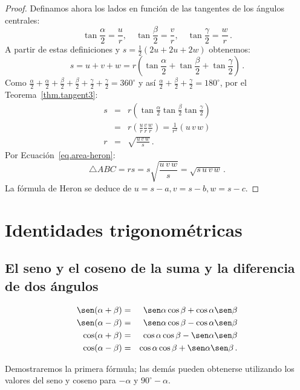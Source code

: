 \begin{proof}
Definamos ahora los lados en función de las tangentes de los ángulos centrales:
\begin{displaymath}
\tan \frac{\alpha}{2} = \frac{u}{r},\quad
\tan \frac{\beta}{2} = \frac{v}{r},\quad
\tan \frac{\gamma}{2} = \frac{w}{r}\,.
\end{displaymath}
A partir de estas definiciones y $s=\frac{1}{2}(2u+2u+2w)$ obtenemos:
\[
s = u+v+w = r\left(\tan \frac{\alpha}{2}+\tan \frac{\beta}{2}+\tan \frac{\gamma}{2}\right)\,.
\]
Como $\frac{\alpha}{2}+\frac{\alpha}{2}+\frac{\beta}{2}+\frac{\beta}{2}+\frac{\gamma}{2}+\frac{\gamma}{2}=360^\circ$ y así $\frac{\alpha}{2}+\frac{\beta}{2}+\frac{\gamma}{2}=180^\circ$, por el Teorema~\ref{thm.tangent3}:
\begin{eqnarray*}
s&=&r\left(\tan \frac{\alpha}{2}\tan \frac{\beta}{2}\tan \frac{\gamma}{2}\right)\\
&=&r\left(\frac{u}{r}\frac{v}{r}\frac{w}{r}\right)=\frac{1}{r^2}(u\,v\,w)\\
r&=&\sqrt{\displaystyle\frac{u\,v\,w}{s}}\,.
\end{eqnarray*}
Por Ecuación~\ref{eq.area-heron}:
\[
\triangle ABC=rs=s\sqrt{\displaystyle\frac{u\,v\,w}{s}}=\sqrt{s\,u\,v\,w}\,.
\]
La fórmula de Heron se deduce de $u=s-a, v=s-b, w=s-c$.
\end{proof}


\section{Identidades trigonométricas}\label{a.trig-identities}


\subsection{El seno y el coseno de la suma y la diferencia de dos ángulos} \label{s.sum-of-trig}

\begin{theorem}\label{thm.sum-of-trig}
\begin{eqnarray*}
\sen(\alpha+\beta) &=& \sen\alpha\cos\beta + \cos\alpha\sen\beta\\
\sen(\alpha-\beta) &=& \sen\alpha\cos\beta - \cos\alpha\sen\beta\\
\cos(\alpha+\beta) &=& \cos\alpha\cos\beta - \sen\alpha\sen\beta\\
\cos(\alpha-\beta) &=& \cos\alpha\cos\beta + \sen\alpha\sen\beta\,.
\end{eqnarray*}
\end{theorem}
Demostraremos la primera fórmula; las demás pueden obtenerse utilizando los valores del seno y coseno para $-\alpha$ y $90^\circ-\alpha$.

